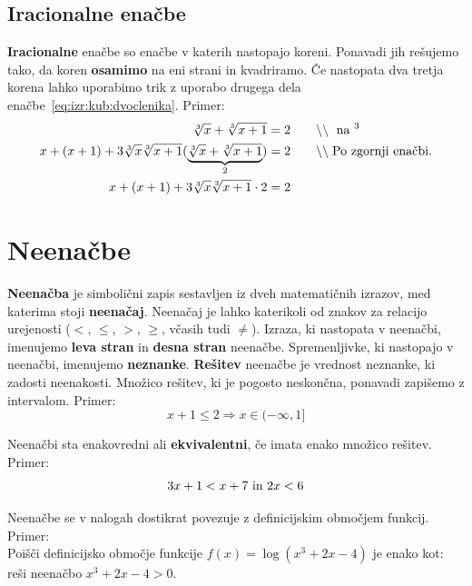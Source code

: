 \documentclass[a4paper,oneside,12pt,fleqn]{article}
\makeatletter
\newcommand\krat\cdot
\newcommand{\comment}[1]{\ensuremath{\qquad\backslash\backslash\;}\textnormal{#1}}
\newcommand{\hyperanchor}[1]{\Hy@raisedlink{\hypertarget{#1}{}}}
\renewcommand\implies\Rightarrow
\numberwithin{equation}{section}
\makeatother
\begin{document}
\subsection{Iracionalne enačbe}
\textbf{Iracionalne} enačbe so enačbe v katerih nastopajo koreni. Ponavadi jih rešujemo
tako, da koren \textbf{osamimo} na eni strani in kvadriramo. Če nastopata dva tretja korena lahko
uporabimo trik z uporabo drugega dela enačbe~\ref{eq:izr:kub:dvoclenika}. Primer:
\begin{align*}
  \sqrt[3]{x} + \sqrt[3]{x+1} &= 2  \comment{ na $^3$} \\
  x + (x+1) + 3\sqrt[3]{x}\sqrt[3]{x+1}(\underbrace{\sqrt[3]{x} + \sqrt[3]{x+1}}_{2}) &=  2
  \comment{Po zgornji enačbi.} \\
  x + (x+1) + 3\sqrt[3]{x}\sqrt[3]{x+1} \krat 2 &= 2
\end{align*}


\section{Neenačbe}
\label{sec:neenac}
\textbf{Neenačba} je simbolični zapis sestavljen iz dveh matematičnih
izrazov, med katerima stoji \textbf{neenačaj}. \hyperanchor{point:neenacaj}
Neenačaj je lahko katerikoli od znakov za relacijo
urejenosti ($<$, $\leq$, $>$, $\geq$, včasih tudi $\neq$). Izraza, ki nastopata v neenačbi,
imenujemo \textbf{leva stran} in \textbf{desna stran} neenačbe.
Spremenljivke, ki nastopajo v neenačbi, imenujemo \textbf{neznanke}.
\textbf{Rešitev} neenačbe je vrednost neznanke, ki zadosti neenakosti. 
Množico rešitev, ki je pogosto neskončna, ponavadi zapišemo z intervalom.
Primer:
\[ x + 1 \leq 2 \implies x \in (-\infty, 1] \]

Neenačbi sta enakovredni ali \textbf{ekvivalentni}, če imata enako množico rešitev.
Primer:
\[ 3x + 1 < x + 7 \textnormal{ in } 2x < 6 \]

Neenačbe se v nalogah dostikrat povezuje z definicijskim območjem funkcij. Primer:\\
Poišči definicijsko območje funkcije $f(x) = \log(x^3 + 2x - 4)$ je enako kot: reši
neenačbo $x^3 + 2x - 4 >0$.
\end{document}
